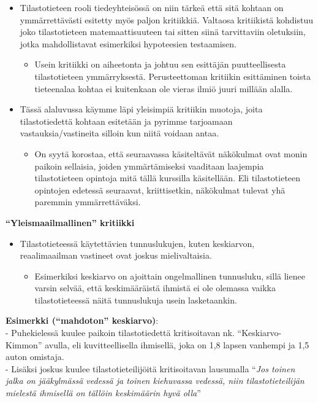 \documentclass[
]{book}
\providecommand{\tightlist}{%
  \setlength{\itemsep}{0pt}\setlength{\parskip}{0pt}}
\begin{document}
\begin{itemize}
\tightlist
\item
  Tilastotieteen rooli tiedeyhteisössä on niin tärkeä että sitä kohtaan on ymmärrettävästi esitetty myös paljon kritiikkiä. Valtaosa kritiikistä kohdistuu joko tilastotieteen matemaattisuuteen tai sitten siinä tarvittaviin oletuksiin, jotka mahdollistavat esimerkiksi hypoteesien testaamisen.

  \begin{itemize}
  \tightlist
  \item
    Usein kritiikki on aiheetonta ja johtuu sen esittäjän puutteellisesta tilastotieteen ymmärryksestä. Perusteettoman kritiikin esittäminen toista tieteenalaa kohtaa ei kuitenkaan ole vieras ilmiö juuri millään alalla.
  \end{itemize}
\item
  Tässä alaluvussa käymme läpi yleisimpiä kritiikin muotoja, joita tilastotiedettä kohtaan esitetään ja pyrimme tarjoamaan vastauksia/vastineita silloin kun niitä voidaan antaa.

  \begin{itemize}
  \tightlist
  \item
    On syytä korostaa, että seuraavassa käsiteltävät näkökulmat ovat monin paikoin sellaisia, joiden ymmärtämiseksi vaaditaan laajempia tilastotieteen opintoja mitä tällä kurssilla käsitellään. Eli tilastotieteen opintojen edetessä seuraavat, kriittisetkin, näkökulmat tulevat yhä paremmin ymmärrettäväksi.
  \end{itemize}
\end{itemize}

\hfill\break
\hfill\break

\textbf{``Yleismaailmallinen'' kritiikki}

\begin{itemize}
\tightlist
\item
  Tilastotieteessä käytettävien tunnuslukujen, kuten keskiarvon, reaalimaailman vastineet ovat joskus mielivaltaisia.

  \begin{itemize}
  \tightlist
  \item
    Esimerkiksi keskiarvo on ajoittain ongelmallinen tunnusluku, sillä lienee varsin selvää, että keskimääräistä ihmistä ei ole olemassa vaikka tilastotieteessä näitä tunnuslukuja usein lasketaankin.
  \end{itemize}
\end{itemize}

\begin{eblock}{}
\textbf{Esimerkki (``mahdoton'' keskiarvo)}:\\
- Puhekielessä kuulee paikoin tilastotiedettä kritisoitavan nk. ``Keskiarvo-Kimmon'' avulla, eli kuvitteellisella ihmisellä, joka on 1,8 lapsen vanhempi ja 1,5 auton omistaja.\\
- Lisäksi joskus kuulee tilastotieteilijöitä kritisoitavan lausumalla ``\emph{Jos toinen jalka on jääkylmässä vedessä ja toinen kiehuvassa vedessä, niin tilastotieteilijän mielestä ihmisellä on tällöin keskimäärin hyvä olla}''

\end{eblock}
\end{document}
